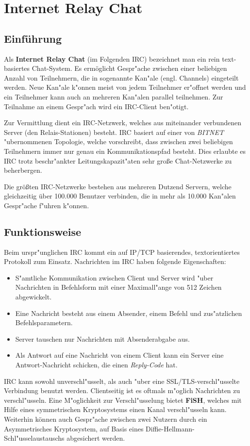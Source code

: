 
\section{Internet Relay Chat}
\subsection{Einführung}
Als \textbf{Internet Relay Chat} (im Folgenden IRC) bezeichnet man ein rein text-basiertes Chat-System. Es ermöglicht Gespr"ache zwischen einer beliebigen Anzahl von Teilnehmern, die in sogenannte Kan"ale (engl. Channels) eingeteilt werden. Neue Kan"ale k"onnen meist von jedem Teilnehmer er"offnet werden und ein Teilnehmer kann auch an mehreren Kan"alen parallel teilnehmen. Zur Teilnahme an einem Gespr"ach wird ein IRC-Client ben"otigt. 

Zur Vermittlung dient ein IRC-Netzwerk, welches aus miteinander verbundenen Server (den Relais-Stationen) besteht. 
IRC basiert auf einer von \textit{BITNET} "ubernommenen Topologie, welche vorschreibt, dass zwischen zwei beliebigen Teilnehmern immer nur genau ein Kommunikationspfad besteht. Dies erlaubte es IRC trotz beschr"ankter Leitungskapazit"aten sehr große Chat-Netzwerke zu beherbergen.

Die größten IRC-Netzwerke bestehen aus mehreren Dutzend Servern, welche gleichzeitig über 100.000 Benutzer verbinden, die in mehr als 10.000 Kan"alen Gespr"ache f"uhren k"onnen.

\subsection{Funktionsweise}
Beim urspr"unglichen IRC kommt ein auf IP/TCP basierendes, textorientiertes Protokoll zum Einsatz.
Nachrichten im IRC haben folgende Eigenschaften:
\begin{itemize}
\item S"amtliche Kommunikation zwischen Client und Server wird "uber Nachrichten in Befehlsform mit einer Maximall"ange von 512 Zeichen abgewickelt.
\item Eine Nachricht besteht aus einem Absender, einem Befehl und zus"atzlichen Befehlsparametern.
\item Server tauschen nur Nachrichten mit Absenderabgabe aus.
\item Als Antwort auf eine Nachricht von einem Client kann ein Server eine Antwort-Nachricht schicken, die einen \textit{Reply-Code} hat. 
\end{itemize}
IRC kann sowohl unverschl"usselt, als auch "uber eine SSL/TLS-verschl"usselte Verbindung benutzt werden. Clientseitig ist es oftmals m"oglich Nachrichten zu verschl"usseln. Eine M"oglichkeit zur Verschl"usselung bietet \textbf{FiSH}, welches mit Hilfe eines symmetrischen Kryptosystems einen Kanal verschl"usseln kann. Weiterhin können auch Gespr"ache zwischen zwei Nutzern durch ein Asymmetrisches Kryptosystem, auf Basis eines Diffie-Hellmann-Schl"usselaustauschs abgesichert werden.

